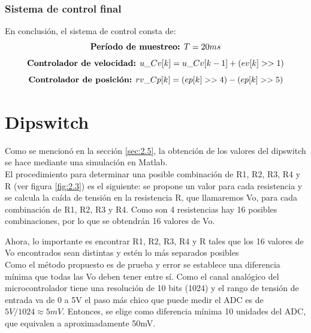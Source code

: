 \subsubsection{Sistema de control final}

En conclusión, el sistema de control consta de:
 \[ \text{\textbf{Período de muestreo:} }  T = 20ms \]
\begin{equation} \label{eq:\theequation}
\text{\textbf{Controlador de velocidad:} } u\_Cv[k] = u\_Cv[k-1] + (ev[k] >> 1)
\end{equation}
\begin{equation} \label{eq:\theequation}
\text{\textbf{Controlador de posición:} } rv\_Cp[k] = (ep[k] >> 4) - (ep[k] >> 5)
\end{equation}

\newpage
\section{Dipswitch} \label{sec:\thesection}
Como se mencionó en la sección \ref{sec:2.5}, la obtención de los valores del dipswitch se hace mediante una simulación en Matlab.\\
El procedimiento para determinar una posible combinación de R1, R2, R3, R4 y R (ver figura \ref{fig:2.3}) es el siguiente: se propone un valor para cada resistencia y se calcula la caída de tensión en la resistencia R, que llamaremos Vo, para cada combinación de R1, R2, R3 y R4. Como son 4 resistencias hay 16 posibles combinaciones, por lo que se obtendrán 16 valores de Vo. 

Ahora, lo importante es encontrar R1, R2, R3, R4 y R tales que los 16 valores de Vo encontrados sean distintas y estén lo más separados posibles\\
Como el método propuesto es de prueba y error se establece una diferencia mínima que todas las Vo deben tener entre sí. Como el canal analógico del microcontrolador tiene una resolución de 10 bits (1024) y el rango de tensión de entrada va de 0 a 5V el paso más chico que puede medir el ADC es de \(5V/1024 \approx 5mV\). Entonces, se elige como diferencia mínima 10 unidades del ADC, que equivalen a aproximadamente 50mV.

